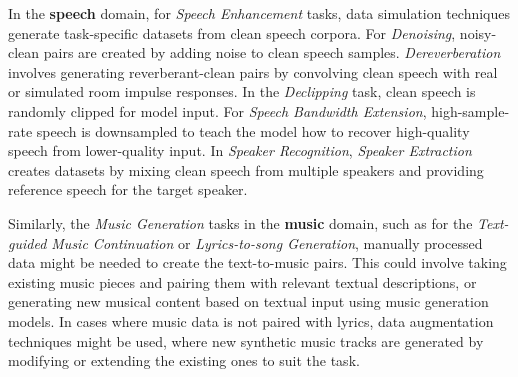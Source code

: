 In the \textbf{speech} domain, for \textit{Speech Enhancement} tasks, data simulation techniques generate task-specific datasets from clean speech corpora. For \textit{Denoising}, noisy-clean pairs are created by adding noise to clean speech samples. \textit{Dereverberation} involves generating reverberant-clean pairs by convolving clean speech with real or simulated room impulse responses. In the \textit{Declipping} task, clean speech is randomly clipped for model input. For \textit{Speech Bandwidth Extension}, high-sample-rate speech is downsampled to teach the model how to recover high-quality speech from lower-quality input. In \textit{Speaker Recognition}, \textit{Speaker Extraction} creates datasets by mixing clean speech from multiple speakers and providing reference speech for the target speaker.




Similarly, the \textit{Music Generation} tasks in the \textbf{music} domain, such as for the \textit{Text-guided Music Continuation} or \textit{Lyrics-to-song Generation}, manually processed data might be needed to create the text-to-music pairs. This could involve taking existing music pieces and pairing them with relevant textual descriptions, or generating new musical content based on textual input using music generation models. In cases where music data is not paired with lyrics, data augmentation techniques might be used, where new synthetic music tracks are generated by modifying or extending the existing ones to suit the task.

